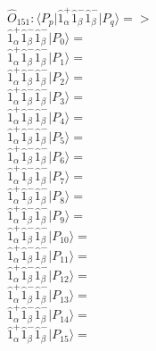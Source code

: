 \documentclass[14pt]{article}
\begin{document}
    $\hat{O}_{151}:  \langle{P_p}\vert \hat{1}_{\alpha}^{+}\hat{1}_{\beta}^{-}\hat{1}_{\beta}^{-} \vert{P_q}\rangle => $ \\ 
    $ \hat{1}_{\alpha}^{+}\hat{1}_{\beta}^{-}\hat{1}_{\beta}^{-} \vert{P_{0}}\rangle =  $ \\ 
    $ \hat{1}_{\alpha}^{+}\hat{1}_{\beta}^{-}\hat{1}_{\beta}^{-} \vert{P_{1}}\rangle =  $ \\ 
    $ \hat{1}_{\alpha}^{+}\hat{1}_{\beta}^{-}\hat{1}_{\beta}^{-} \vert{P_{2}}\rangle =  $ \\ 
    $ \hat{1}_{\alpha}^{+}\hat{1}_{\beta}^{-}\hat{1}_{\beta}^{-} \vert{P_{3}}\rangle =  $ \\ 
    $ \hat{1}_{\alpha}^{+}\hat{1}_{\beta}^{-}\hat{1}_{\beta}^{-} \vert{P_{4}}\rangle =  $ \\ 
    $ \hat{1}_{\alpha}^{+}\hat{1}_{\beta}^{-}\hat{1}_{\beta}^{-} \vert{P_{5}}\rangle =  $ \\ 
    $ \hat{1}_{\alpha}^{+}\hat{1}_{\beta}^{-}\hat{1}_{\beta}^{-} \vert{P_{6}}\rangle =  $ \\ 
    $ \hat{1}_{\alpha}^{+}\hat{1}_{\beta}^{-}\hat{1}_{\beta}^{-} \vert{P_{7}}\rangle =  $ \\ 
    $ \hat{1}_{\alpha}^{+}\hat{1}_{\beta}^{-}\hat{1}_{\beta}^{-} \vert{P_{8}}\rangle =  $ \\ 
    $ \hat{1}_{\alpha}^{+}\hat{1}_{\beta}^{-}\hat{1}_{\beta}^{-} \vert{P_{9}}\rangle =  $ \\ 
    $ \hat{1}_{\alpha}^{+}\hat{1}_{\beta}^{-}\hat{1}_{\beta}^{-} \vert{P_{10}}\rangle =  $ \\ 
    $ \hat{1}_{\alpha}^{+}\hat{1}_{\beta}^{-}\hat{1}_{\beta}^{-} \vert{P_{11}}\rangle =  $ \\ 
    $ \hat{1}_{\alpha}^{+}\hat{1}_{\beta}^{-}\hat{1}_{\beta}^{-} \vert{P_{12}}\rangle =  $ \\ 
    $ \hat{1}_{\alpha}^{+}\hat{1}_{\beta}^{-}\hat{1}_{\beta}^{-} \vert{P_{13}}\rangle =  $ \\ 
    $ \hat{1}_{\alpha}^{+}\hat{1}_{\beta}^{-}\hat{1}_{\beta}^{-} \vert{P_{14}}\rangle =  $ \\ 
    $ \hat{1}_{\alpha}^{+}\hat{1}_{\beta}^{-}\hat{1}_{\beta}^{-} \vert{P_{15}}\rangle =  $ \\ 
    
\end{document}
